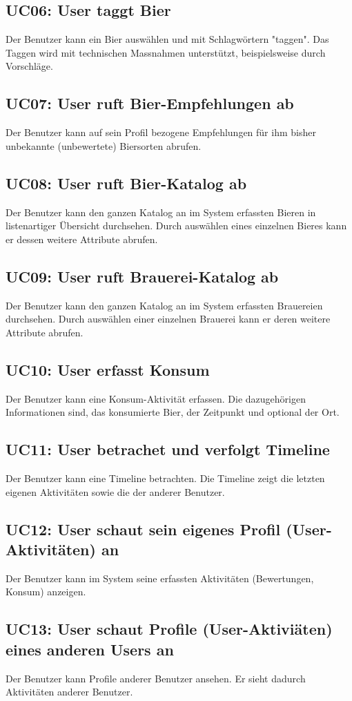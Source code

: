 \documentclass[10pt,a4paper]{scrartcl}
\begin{document}
\subsection*{UC06: User taggt Bier}
Der Benutzer kann ein Bier auswählen und mit Schlagwörtern "taggen". Das Taggen wird mit technischen Massnahmen unterstützt, beispielsweise durch Vorschläge.
\subsection*{UC07: User ruft Bier-Empfehlungen ab}
Der Benutzer kann auf sein Profil bezogene Empfehlungen für ihm bisher unbekannte (unbewertete) Biersorten abrufen.
\subsection*{UC08: User ruft Bier-Katalog ab}
Der Benutzer kann den ganzen Katalog an im System erfassten Bieren in listenartiger Übersicht durchsehen. Durch auswählen eines einzelnen Bieres kann er dessen weitere Attribute abrufen.
\subsection*{UC09: User ruft Brauerei-Katalog ab}
Der Benutzer kann den ganzen Katalog an im System erfassten Brauereien durchsehen. Durch auswählen einer einzelnen Brauerei kann er deren weitere Attribute abrufen.
\subsection*{UC10: User erfasst Konsum}
Der Benutzer kann eine Konsum-Aktivität erfassen. Die dazugehörigen Informationen sind, das konsumierte Bier, der Zeitpunkt und optional der Ort.
\subsection*{UC11: User betrachet und verfolgt Timeline}
Der Benutzer kann eine Timeline betrachten. Die Timeline zeigt die letzten eigenen Aktivitäten sowie die der anderer Benutzer.
\subsection*{UC12: User schaut sein eigenes Profil (User-Aktivitäten) an}
Der Benutzer kann im System seine erfassten Aktivitäten (Bewertungen, Konsum) anzeigen.
\subsection*{UC13: User schaut Profile (User-Aktiviäten) eines anderen Users an}
Der Benutzer kann Profile anderer Benutzer ansehen. Er sieht dadurch Aktivitäten anderer Benutzer.
\end{document}
